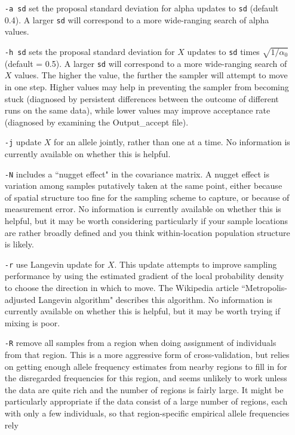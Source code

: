 \documentclass[10pt,titlepage,times,letterpaper]{article}
\begin{document}
\begin{itemize}
\item[{\tt -a sd}] set the proposal standard deviation for alpha updates to
{\tt sd} (default 0.4).  A larger {\tt sd} will correspond to a more
wide-ranging search of alpha values.
\item[{\tt -h sd}] sets the
proposal standard deviation for $X$ updates to {\tt sd} times
$\sqrt{1/\alpha_0}$ (default = 0.5).  A larger {\tt sd} 
will correspond to a 
more wide-ranging search of $X$ values.  The higher the value, the further
the sampler will attempt to move in one step.  Higher values may help
in preventing the sampler from becoming stuck (diagnosed by persistent
differences between the outcome of different runs on the same data), while
lower values may improve acceptance rate (diagnosed by examining the
Output\_accept file).
\item[{\tt -j}] update $X$ for an allele jointly, rather than one at a time.
No information is currently available on whether this is
helpful.
\item[{\tt -N}] includes a ``nugget effect" in the covariance matrix.  
A nugget effect is variation among samples putatively
taken at the same point, either because of spatial structure too fine
for the sampling scheme to capture, or because of measurement error.
No information is currently available on whether this is helpful, but it
may be worth considering particularly if your sample locations are
rather broadly defined and you think within-location population structure
is likely.
\item[{\tt -r}] use Langevin update for $X$.   This 
update attempts to improve sampling performance by using the estimated 
gradient of the local probability density to choose the direction in
which to move.  The Wikipedia article ``Metropolis-adjusted Langevin 
algorithm" describes this algorithm.  No information is currently
available on whether this is helpful, but it may be worth trying if
mixing is poor.
\item[{\tt -R}] remove
all samples from a region when doing assignment of individuals from
that region.  This is a more aggressive form of cross-validation,
but relies on getting enough allele frequency estimates from nearby
regions to fill in for the disregarded frequencies for this region, and
seems unlikely to work unless the data are quite rich and the number of
regions is fairly large.  It might be particularly appropriate if the
data consist of a large number of regions, each with only a few
individuals, so that region-specific empirical allele frequencies rely

\end{itemize}
\end{document}
